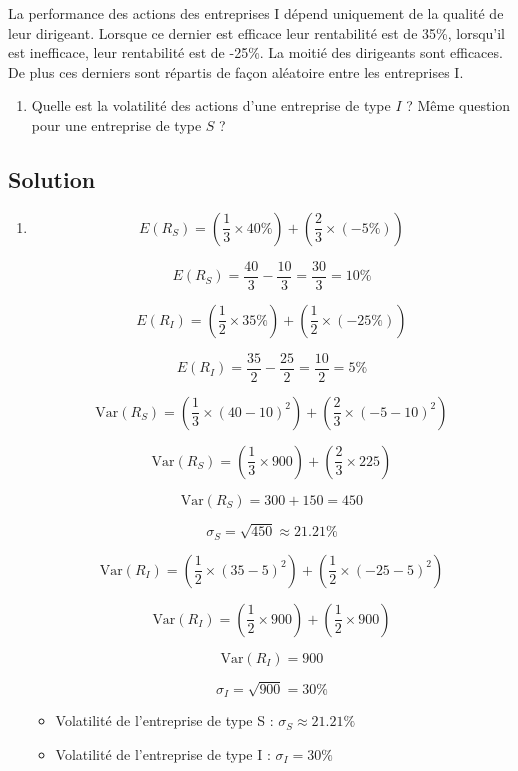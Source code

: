 \documentclass[a4paper, 12pt]{report}
\begin{document}
La performance des actions des entreprises I dépend uniquement de la qualité de leur dirigeant. Lorsque ce dernier est efficace leur rentabilité est de 35\%, lorsqu'il est inefficace, leur rentabilité est de -25\%. La moitié des dirigeants sont efficaces. De plus ces derniers sont répartis de façon aléatoire entre les entreprises I.

\begin{enumerate}
	\item Quelle est la volatilité des actions d'une entreprise de type  \( I \) ? Même question pour une entreprise de type \( S \) ?
\end{enumerate}

\subsection{Solution}

\begin{enumerate}
	\item \[
E(R_S) = \left(\frac{1}{3} \times 40\%\right) + \left(\frac{2}{3} \times (-5\%)\right)
\]

\[
E(R_S) = \frac{40}{3} - \frac{10}{3} = \frac{30}{3} = 10\%
\]



\[
E(R_I) = \left(\frac{1}{2} \times 35\%\right) + \left(\frac{1}{2} \times (-25\%)\right)
\]

\[
E(R_I) = \frac{35}{2} - \frac{25}{2} = \frac{10}{2} = 5\%
\]

\[
\text{Var}(R_S) = \left(\frac{1}{3} \times (40 - 10)^2\right) + \left(\frac{2}{3} \times (-5 - 10)^2\right)
\]

\[
\text{Var}(R_S) = \left(\frac{1}{3} \times 900\right) + \left(\frac{2}{3} \times 225\right)
\]

\[
\text{Var}(R_S) = 300 + 150 = 450
\]

\[
\sigma_S = \sqrt{450} \approx 21.21\%
\]

\[
\text{Var}(R_I) = \left(\frac{1}{2} \times (35 - 5)^2\right) + \left(\frac{1}{2} \times (-25 - 5)^2\right)
\]

\[
\text{Var}(R_I) = \left(\frac{1}{2} \times 900\right) + \left(\frac{1}{2} \times 900\right)
\]

\[
\text{Var}(R_I) = 900
\]

\[
\sigma_I = \sqrt{900} = 30\%
\]

\begin{itemize}
	\item Volatilité de l’entreprise de type S : \( \sigma_S \approx 21.21\% \)
	\item Volatilité de l’entreprise de type I : \( \sigma_I = 30\% \)
\end{itemize}
\end{enumerate}
\end{document}
